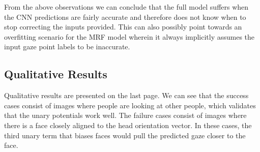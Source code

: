 \documentclass[10pt,twocolumn,letterpaper]{article}
\begin{document}
From the above observations we can conclude that the full model suffers when the CNN predictions are fairly accurate and therefore does not know when to stop correcting the inputs provided. This can also possibly point towards an overfitting scenario for the MRF model wherein it always implicitly assumes the input gaze point labels to be inaccurate.

\subsection{Qualitative Results}

Qualitative results are presented on the last page. We can see that the success cases consist of images where people are looking at other people, which validates that the unary potentials work well. The failure cases consist of images where there is a face closely aligned to the head orientation vector. In these cases, the third unary term that biases faces would pull the predicted gaze closer to the face.
\end{document}
